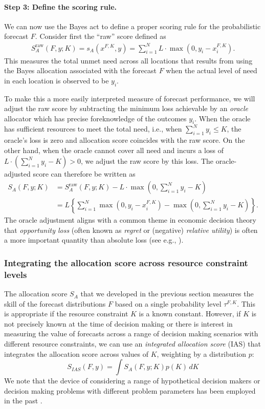 \documentclass{article}\usepackage[]{graphicx}\usepackage[]{xcolor}
\begin{document}
\paragraph{Step 3: Define the scoring rule.} We can now use the Bayes act to define a proper scoring rule for the probabilistic forecast $F$.
Consider first the ``raw'' score defined as
\begin{align}
S_A^{\text{raw}}(F, y; K) = s_A(x^{F,K}, y) = \sum_{i=1}^N L \cdot \max(0, y_i - x_i^{F,K}).
\end{align}
This measures the total unmet need across all locations that results from using the Bayes allocation associated with the forecast $F$ when the actual level of need in each location is observed to be $y_i$.

To make this a more easily interpreted measure of forecast performance, we will adjust the raw score by subtracting the minimum loss
achievable by an \emph{oracle} allocator which has precise foreknowledge of the outcomes $y_i$.
When the oracle has sufficient resources to meet the total need, i.e., when $\sum_{i=1}^{N}y_i \leq K$, the oracle's loss is zero 
and allocation score coincides with the raw score.
On the other hand, when the oracle cannot cover all need and incurs a loss of $L \cdot \left(\sum_{i=1}^{N}y_i - K \right) > 0$, we adjust
the raw score by this loss.
The oracle-adjusted score can therefore be written as
\begin{align}
S_A(F, y; K)  &= S_A^{\text{raw}}(F, y; K) - L \cdot \max\left(0,\sum_{i=1}^{N}y_i - K\right) \\
&= L\left\{\sum_{i=1}^N \max(0, y_i - x_i^{F,K}) -  \max\left(0,\sum_{i=1}^{N}y_i - K\right)\right\}.
\end{align}
The oracle adjustment aligns with a common theme in economic decision theory that \emph{opportunity loss} (often known as \emph{regret} or (negative) \emph{relative utility}) is often a more important quantity than absolute loss (see e.g., \cite{DIECIDUE201788}).

\subsubsection{Integrating the allocation score across resource constraint levels}{}
\label{sec:methods.detailed.integrated_allocation}

The allocation score $S_A$ that we developed in the previous section measures the skill of the forecast distributions $F$ based on a single probability level $\tau^{F,K}$. This is appropriate if the resource constraint $K$ is a known constant. However, if $K$ is not precisely known at the time of decision making or there is interest in measuring the value of forecasts across a range of decision making scenarios with different resource constraints, we can use an \emph{integrated allocation score} (IAS) that integrates the allocation score across values of $K$, weighting by a distribution $p$:
$$S_{IAS}(F, y) = \int S_A(F,y; K) p(K) \, dK$$
We note that the device of considering a range of hypothetical decision makers or decision making problems with different problem parameters has been employed in the past \cite[e.g.,][]{murphy1993whatisagoodforecast}.
\end{document}
